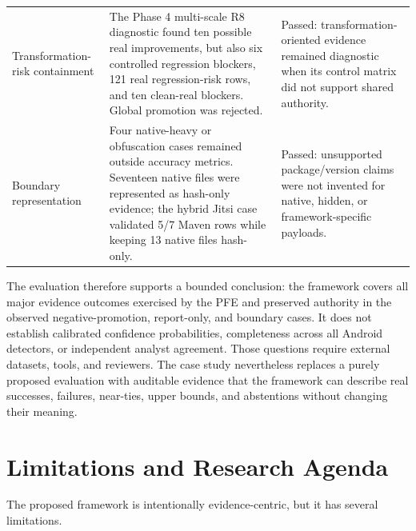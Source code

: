 \begin{longtable}{>{\raggedright\arraybackslash}p{}>{\raggedright\arraybackslash}p{}>{\raggedright\arraybackslash}p{}}
Transformation-risk containment &
The Phase 4 multi-scale R8 diagnostic found ten possible real improvements,
but also six controlled regression blockers, 121 real regression-risk rows,
and ten clean-real blockers. Global promotion was rejected. &
Passed: transformation-oriented evidence remained diagnostic when its control
matrix did not support shared authority.\\

Boundary representation &
Four native-heavy or obfuscation cases remained outside accuracy metrics.
Seventeen native files were represented as hash-only evidence; the hybrid
Jitsi case validated 5/7 Maven rows while keeping 13 native files hash-only. &
Passed: unsupported package/version claims were not invented for native,
hidden, or framework-specific payloads.\\
\bottomrule
\end{longtable}
\endgroup

The evaluation therefore supports a bounded conclusion: the framework covers
all major evidence outcomes exercised by the PFE and preserved authority in
the observed negative-promotion, report-only, and boundary cases. It does not
establish calibrated confidence probabilities, completeness across all Android
detectors, or independent analyst agreement. Those questions require external
datasets, tools, and reviewers. The case study nevertheless replaces a purely
proposed evaluation with auditable evidence that the framework can describe
real successes, failures, near-ties, upper bounds, and abstentions without
changing their meaning.

\section{Limitations and Research Agenda}

The proposed framework is intentionally evidence-centric, but it has several
limitations.

